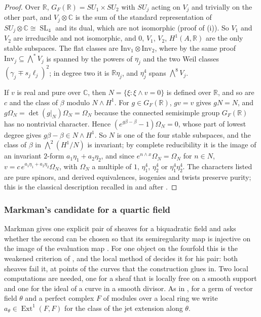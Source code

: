 \documentclass[11pt,reqno]{amsart}
\theoremstyle{plain}
\theoremstyle{definition}
\theoremstyle{remark}
\newcommand{\RR}{\mathbb{R}}
\newcommand{\CC}{\mathbb{C}}
\DeclareMathOperator{\Ext}{Ext}
\DeclareMathOperator{\SL}{SL}
\begin{document}
\begin{proof}
Over $\RR$, $G_{F}(\RR)=SU_{1}\times SU_{2}$ with $SU_{j}$ acting on $V_{j}$
and trivially on the other part, and $V_{j}\otimes\CC$ is the sum of the
standard representation of $SU_{j}\otimes\CC\cong\SL_{4}$ and its dual, which
are not isomorphic (proof of (i)). So $V_{1}$ and
$V_{2}$ are irreducible and not isomorphic, and $0$, $V_{1}$, $V_{2}$,
$H^{1}(A,\RR)$ are the only stable subspaces. The flat classes are
$\mathrm{Inv}_{1}\otimes\mathrm{Inv}_{2}$, where by the same proof
$\mathrm{Inv}_{j}\subseteq\bigwedge^{*}V_{j}$ is spanned by the powers of
$\eta_{j}$ and the two Weil classes $(\gamma_{j}\mp s_{j}\ell_{j})^{2}$; in
degree two it is $\RR\eta_{j}$, and $\eta_{j}^{4}$ spans $\bigwedge^{8}V_{j}$.

If $v$ is real and pure over $\CC$, then $N=\{\xi:\xi\wedge v=0\}$ is
defined over $\RR$, and so are $c$ and the class of $\beta$ modulo
$N\wedge H^{1}$. For $g\in G_{F}(\RR)$, $gv=v$ gives $gN=N$, and
$g\Omega_{N}=\det(g|_{N})\Omega_{N}=\Omega_{N}$ because the connected
semisimple group $G_{F}(\RR)$ has no nontrivial character. Hence
$(e^{g\beta-\beta}-1)\Omega_{N}=0$, whose part of lowest degree gives
$g\beta-\beta\in N\wedge H^{1}$. So $N$ is one of the four stable subspaces,
and the class of $\beta$ in $\bigwedge^{2}(H^{1}/N)$ is invariant; by complete
reducibility it is the image of an invariant $2$-form
$a_{1}\eta_{1}+a_{2}\eta_{2}$, and since $e^{n\wedge x}\Omega_{N}=\Omega_{N}$
for $n\in N$, $v=c\,e^{a_{1}\eta_{1}+a_{2}\eta_{2}}\Omega_{N}$, with
$\Omega_{N}$ a multiple of $1$, $\eta_{1}^{4}$, $\eta_{2}^{4}$ or
$\eta_{1}^{4}\eta_{2}^{4}$. The characters listed are pure spinors, and
derived equivalences, isogenies and twists preserve purity; this is the
classical description recalled in  and after
.
\end{proof}

\subsubsection*{Markman's candidate for a quartic field}

Markman gives one explicit pair of sheaves for a biquadratic field
\cite[Example~11.2.7, Lemma~11.2.8]{Mar25c} and asks whether the second can
be chosen so that its semiregularity map is injective on the image of the
evaluation map \cite[Question~11.2.2]{Mar25c}. For one object on the fourfold
this is the weakened criterion of , and the local
method of  decides it for his pair: both sheaves
fail it, at points of the curves that the construction glues in. Two local
computations are needed, one for a sheaf that is locally free on a smooth
support and one for the ideal of a curve in a smooth divisor. As in
, for a germ of vector field $\theta$ and a perfect
complex $F$ of modules over a local ring we write
$a_{\theta}\in\Ext^{1}(F,F)$ for the class of the jet extension along
$\theta$.
\end{document}
